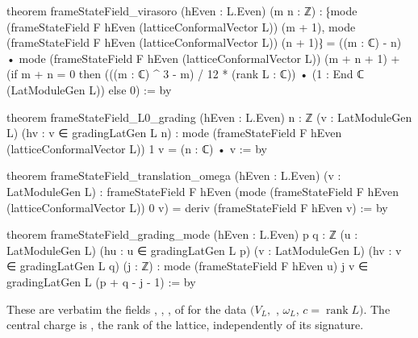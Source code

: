 \begin{leancode}
theorem frameStateField_virasoro (hEven : L.Even)  (m n : ℤ) :
    ⁅mode (frameStateField F hEven (latticeConformalVector L)) (m + 1),
      mode (frameStateField F hEven (latticeConformalVector L)) (n + 1)⁆
      = ((m : ℂ) - n) • mode (frameStateField F hEven (latticeConformalVector L)) (m + n + 1)
        + (if m + n = 0 then (((m : ℂ) ^ 3 - m) / 12 * (rank L : ℂ)) • (1 : End ℂ (LatModuleGen L))
           else 0) := by

theorem frameStateField_L0_grading (hEven : L.Even)  {n : ℤ} (v : LatModuleGen L)
    (hv : v ∈ gradingLatGen L n) :
    mode (frameStateField F hEven (latticeConformalVector L)) 1 v = (n : ℂ) • v := by

theorem frameStateField_translation_omega (hEven : L.Even)  (v : LatModuleGen L) :
    frameStateField F hEven (mode (frameStateField F hEven (latticeConformalVector L)) 0 v)
      = deriv (frameStateField F hEven v) := by

theorem frameStateField_grading_mode (hEven : L.Even)  {p q : ℤ} (u : LatModuleGen L)
    (hu : u ∈ gradingLatGen L p) (v : LatModuleGen L) (hv : v ∈ gradingLatGen L q) (j : ℤ) :
    mode (frameStateField F hEven u) j v ∈ gradingLatGen L (p + q - j - 1) := by
\end{leancode}

\begin{dictionary}
These are verbatim the fields , , ,  of
 for the data $(V_L,$ , $\omega_L$, $c=\operatorname{rank}L)$.  The central
charge is , the rank of the lattice, independently of its signature.
\end{dictionary}


